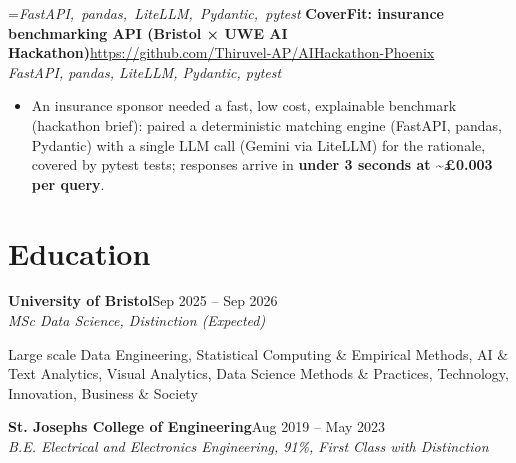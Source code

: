 \documentclass[a4paper,11pt]{article}
\newcommand{\roleNoLoc}[3]{\textbf{#1}\hfill{\color{muted}#2}\\ \textit{#3}\par}
\newcommand{\project}[3]{%
  \textbf{#1}\hfill#3\\ {\color{muted}\small\textit{#2}}\par}
\newcommand{\gap}{\vspace{5pt}}
\newcommand{\num}[1]{\textbf{#1}}   %
\begin{document}
=\hbox{{\small\textit{FastAPI, pandas, LiteLLM, Pydantic, pytest}}}%
\ifdim\wd0>\linewidth
\ifdim\wd2>\linewidth
\textbf{CoverFit: insurance benchmarking API (Bristol × UWE AI Hackathon)}\\ {\color{muted}\small\textit{FastAPI, pandas, LiteLLM, Pydantic, pytest}}\\ \hfill{\small\url{https://github.com/Thiruvel-AP/AIHackathon-Phoenix}}\par
\else
\textbf{CoverFit: insurance benchmarking API (Bristol × UWE AI Hackathon)}\\ {\color{muted}\small\textit{FastAPI, pandas, LiteLLM, Pydantic, pytest}}\hfill{\small\url{https://github.com/Thiruvel-AP/AIHackathon-Phoenix}}\par
\fi
\else
\project{CoverFit: insurance benchmarking API (Bristol × UWE AI Hackathon)}{FastAPI, pandas, LiteLLM, Pydantic, pytest}{\url{https://github.com/Thiruvel-AP/AIHackathon-Phoenix}}
\fi
\begin{itemize}
  \item An insurance sponsor needed a fast, low cost, explainable benchmark (hackathon brief): paired a deterministic matching engine (FastAPI, pandas, Pydantic) with a single LLM call (Gemini via LiteLLM) for the rationale, covered by pytest tests; responses arrive in \num{under 3 seconds at \textasciitilde{}£0.003 per query}.
\end{itemize}

\section{Education}
\roleNoLoc{University of Bristol}{Sep 2025 – Sep 2026}{MSc Data Science, Distinction \textit{(Expected)}}
{\color{muted}\small Large scale Data Engineering, Statistical Computing \& Empirical Methods, AI \& Text Analytics, Visual Analytics, Data Science Methods \& Practices, Technology, Innovation, Business \& Society}\par
\gap
{}
\roleNoLoc{St. Joseph\textquotesingle{}s College of Engineering}{Aug 2019 – May 2023}{B.E. Electrical and Electronics Engineering, 91\%, First Class with Distinction}
\end{document}
